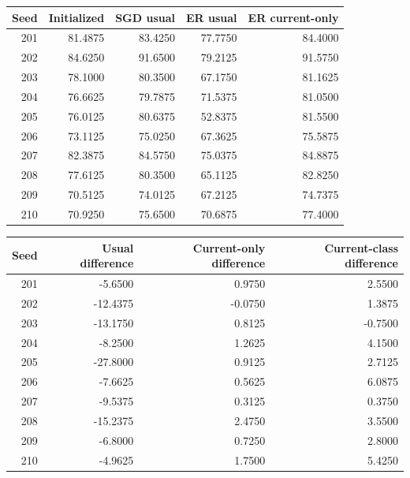 \setlength{\tabcolsep}{4pt}
\begin{tabular}{rrrrr}
\toprule
Seed & Initialized & SGD usual & ER usual & ER current-only\\
\midrule
201 & 81.4875 & 83.4250 & 77.7750 & 84.4000\\
202 & 84.6250 & 91.6500 & 79.2125 & 91.5750\\
203 & 78.1000 & 80.3500 & 67.1750 & 81.1625\\
204 & 76.6625 & 79.7875 & 71.5375 & 81.0500\\
205 & 76.0125 & 80.6375 & 52.8375 & 81.5500\\
206 & 73.1125 & 75.0250 & 67.3625 & 75.5875\\
207 & 82.3875 & 84.5750 & 75.0375 & 84.8875\\
208 & 77.6125 & 80.3500 & 65.1125 & 82.8250\\
209 & 70.5125 & 74.0125 & 67.2125 & 74.7375\\
210 & 70.9250 & 75.6500 & 70.6875 & 77.4000\\
\bottomrule
\end{tabular}
\par\medskip
\begin{tabular}{rrrr}
\toprule
Seed & Usual difference & Current-only difference & Current-class difference\\
\midrule
201 & -5.6500 & 0.9750 & 2.5500\\
202 & -12.4375 & -0.0750 & 1.3875\\
203 & -13.1750 & 0.8125 & -0.7500\\
204 & -8.2500 & 1.2625 & 4.1500\\
205 & -27.8000 & 0.9125 & 2.7125\\
206 & -7.6625 & 0.5625 & 6.0875\\
207 & -9.5375 & 0.3125 & 0.3750\\
208 & -15.2375 & 2.4750 & 3.5500\\
209 & -6.8000 & 0.7250 & 2.8000\\
210 & -4.9625 & 1.7500 & 5.4250\\
\bottomrule
\end{tabular}
